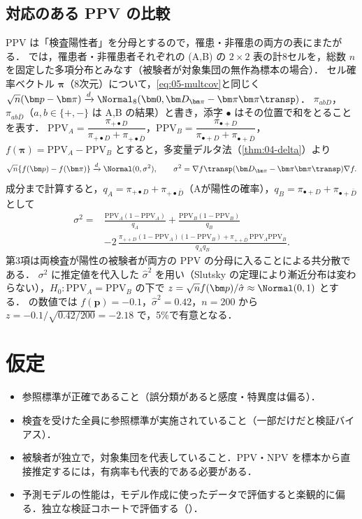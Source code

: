 \subsection{対応のある PPV の比較}\label{subsec:05-ppv}
\Youchui PPV は「検査陽性者」を分母とするので，罹患・非罹患の両方の表にまたがる．
 では，罹患者・非罹患者それぞれの (A,B) の $2\times2$ 表の計8セルを，総数 $n$ を固定した多項分布とみなす（被験者が対象集団の無作為標本の場合）．
セル確率ベクトル $\bm\pi$（8次元）について，\cref{eq:05-multcov}と同じく $\sqrt n(\bm p-\bm\pi)\xrightarrow{d}\Normal_8(\bm0,\bm D_{\bm\pi}-\bm\pi\bm\pi\transp)$．
$\pi_{ab D}$，$\pi_{ab\bar D}$（$a,b\in\{+,-\}$ は A,B の結果）と書き，添字 $\bullet$ はその位置で和をとることを表す．
$\mathrm{PPV}_A=\dfrac{\pi_{+\bullet D}}{\pi_{+\bullet D}+\pi_{+\bullet\bar D}}$，$\mathrm{PPV}_B=\dfrac{\pi_{\bullet+D}}{\pi_{\bullet+D}+\pi_{\bullet+\bar D}}$，
$f(\bm\pi)=\mathrm{PPV}_A-\mathrm{PPV}_B$ とすると，多変量デルタ法（\cref{thm:04-delta}）より
\[
\sqrt n\{f(\bm p)-f(\bm\pi)\}\xrightarrow{d}\Normal(0,\sigma^2),\qquad \sigma^2=\nabla f\transp(\bm D_{\bm\pi}-\bm\pi\bm\pi\transp)\nabla f.
\]
成分まで計算すると，$q_A=\pi_{+\bullet D}+\pi_{+\bullet\bar D}$（Aが陽性の確率），$q_B=\pi_{\bullet+D}+\pi_{\bullet+\bar D}$ として
\begin{equation}
\begin{split}
\sigma^2={}&\frac{\mathrm{PPV}_A(1-\mathrm{PPV}_A)}{q_A}+\frac{\mathrm{PPV}_B(1-\mathrm{PPV}_B)}{q_B}\\
&-2\,\frac{\pi_{++D}(1-\mathrm{PPV}_A)(1-\mathrm{PPV}_B)+\pi_{++\bar D}\,\mathrm{PPV}_A\mathrm{PPV}_B}{q_Aq_B}.
\end{split}\label{eq:05-ppvvar}
\end{equation}
第3項は両検査が陽性の被験者が両方の PPV の分母に入ることによる共分散である．
$\sigma^2$ に推定値を代入した $\hat\sigma^2$ を用い（Slutsky の定理により漸近分布は変わらない），$H_0:\mathrm{PPV}_A=\mathrm{PPV}_B$ の下で
$z=\sqrt n f(\bm p)/\hat\sigma\approx\Normal(0,1)$ とする． の数値では $f(\bm p)=-0.1$，$\hat\sigma^2=0.42$，$n=200$ から $z=-0.1/\sqrt{0.42/200}=-2.18$ で，5\%で有意となる．

\section{仮定}\label{sec:05-assump}
\begin{itemize}
\item 参照標準が正確であること（誤分類があると感度・特異度は偏る）．
\item 検査を受けた全員に参照標準が実施されていること（一部だけだと検証バイアス）．
\item 被験者が独立で，対象集団を代表していること．PPV・NPV を標本から直接推定するには，有病率も代表的である必要がある．
\item 予測モデルの性能は，モデル作成に使ったデータで評価すると楽観的に偏る．独立な検証コホートで評価する（）．
\end{itemize}

